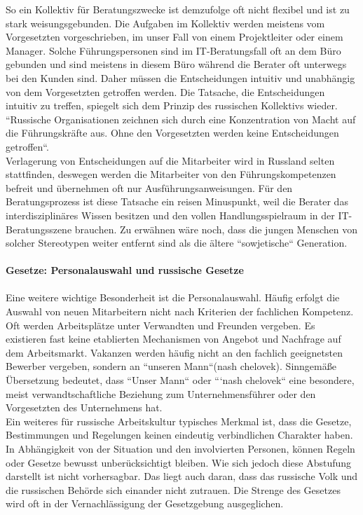	So ein Kollektiv für Beratungszwecke ist demzufolge oft nicht flexibel und ist zu stark weisungsgebunden. Die Aufgaben im Kollektiv werden meistens vom Vorgesetzten vorgeschrieben, im unser Fall von einem Projektleiter oder einem Manager. Solche Führungspersonen sind im IT-Beratungsfall oft an dem Büro gebunden und sind meistens in diesem Büro während die Berater oft unterwegs bei den Kunden sind. Daher müssen die Entscheidungen intuitiv und unabhängig von dem Vorgesetzten getroffen werden. Die Tatsache, die Entscheidungen intuitiv zu treffen, spiegelt sich dem Prinzip des russischen Kollektivs wieder.  ``Russische Organisationen zeichnen sich durch eine Konzentration von Macht auf die Führungskräfte aus. Ohne den Vorgesetzten werden keine Entscheidungen getroffen``. \cite{ProzessbeglBerRU} \\
	Verlagerung von Entscheidungen auf die Mitarbeiter wird in Russland selten stattfinden, deswegen werden die Mitarbeiter von den Führungskompetenzen befreit und übernehmen oft nur Ausführungsanweisungen. Für  den Beratungsprozess ist diese Tatsache ein reisen Minuspunkt, weil die Berater das interdisziplinäres Wissen besitzen und  den vollen Handlungsspielraum in der IT-Beratungsszene brauchen.
	Zu erwähnen wäre noch, dass die jungen Menschen von solcher Stereotypen weiter entfernt sind als die ältere ``sowjetische`` Generation. \\ \\
	\textbf{Gesetze: Personalauswahl und russische Gesetze}\\
	\\
	 Eine weitere wichtige Besonderheit ist die Personalauswahl. Häufig erfolgt die Auswahl von neuen Mitarbeitern nicht nach Kriterien der fachlichen Kompetenz. Oft werden Arbeitsplätze unter Verwandten und 
	 Freunden vergeben. Es existieren fast keine etablierten Mechanismen von Angebot und Nachfrage auf dem Arbeitsmarkt. Vakanzen werden häufig nicht an den fachlich geeignetsten Bewerber vergeben, sondern an ``unseren Mann``(nash chelovek). Sinngemäße Übersetzung bedeutet, dass ``Unser Mann`` oder ```nash chelovek`` eine besondere, meist verwandtschaftliche Beziehung zum Unternehmensführer oder den Vorgesetzten des Unternehmens hat.\\
	 Ein weiteres für russische Arbeitskultur typisches Merkmal ist, dass die Gesetze, Bestimmungen und Regelungen keinen eindeutig verbindlichen Charakter haben. In Abhängigkeit von der Situation und den involvierten Personen, können Regeln oder Gesetze bewusst unberücksichtigt bleiben. Wie sich jedoch diese Abstufung darstellt ist nicht vorhersagbar. Das liegt auch daran, dass das russische Volk und die russischen Behörde sich einander nicht zutrauen. Die Strenge des Gesetzes wird oft in der Vernachlässigung der Gesetzgebung ausgeglichen. \cite{ProzessbeglBerRU}\\ \\ 
